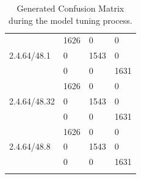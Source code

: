 \documentclass[12pt]{article}
\begin{document}
\begin{longtable}{llll}
\multirow{3}{*}{2.4.64/48.1}   &  1626 & 0 & 0 \\
                                                                            &  0 & 1543 & 0 \\
                                                                            &  0 & 0 & 1631 \\ \hline
\multirow{3}{*}{2.4.64/48.32}   &  1626 & 0 & 0 \\
                                                                            &  0 & 1543 & 0 \\
                                                                            &  0 & 0 & 1631 \\ \hline
\multirow{3}{*}{2.4.64/48.8}   &  1626 & 0 & 0 \\
                                                                            &  0 & 1543 & 0 \\
                                                                            &  0 & 0 & 1631 \\ 
\caption{Generated Confusion Matrix during the model tuning process.}
\label{tab:cmatrix}
\end{longtable}

\pagebreak
\end{document}
